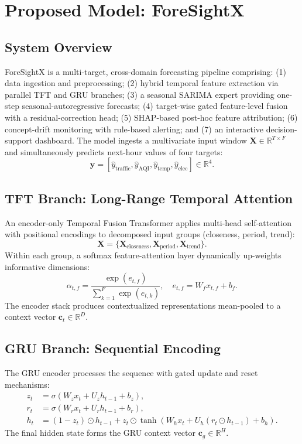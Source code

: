 \documentclass[conference]{IEEEtran}
\begin{document}
\section{Proposed Model: ForeSightX}
\subsection{System Overview}
ForeSightX is a multi-target, cross-domain forecasting pipeline comprising: (1) data ingestion and preprocessing; (2) hybrid temporal feature extraction via parallel TFT and GRU branches; (3) a seasonal SARIMA expert providing one-step seasonal-autoregressive forecasts; (4) target-wise gated feature-level fusion with a residual-correction head; (5) SHAP-based post-hoc feature attribution; (6) concept-drift monitoring with rule-based alerting; and (7) an interactive decision-support dashboard. The model ingests a multivariate input window $\mathbf{X} \in \mathbb{R}^{T \times F}$ and simultaneously predicts next-hour values of four targets:
\begin{equation}
\hat{\mathbf{y}} = [\hat{y}_{\text{traffic}}, \hat{y}_{\text{AQI}}, \hat{y}_{\text{temp}}, \hat{y}_{\text{elec}}] \in \mathbb{R}^{4}.
\end{equation}

\subsection{TFT Branch: Long-Range Temporal Attention}
An encoder-only Temporal Fusion Transformer applies multi-head self-attention with positional encodings to decomposed input groups (closeness, period, trend):
\begin{equation}
\mathbf{X} = \{\mathbf{X}_{\text{closeness}}, \mathbf{X}_{\text{period}}, \mathbf{X}_{\text{trend}}\}.
\end{equation}
Within each group, a softmax feature-attention layer dynamically up-weights informative dimensions:
\begin{equation}
\alpha_{t,f} = \frac{\exp(e_{t,f})}{\sum_{k=1}^{F}\exp(e_{t,k})}, \quad e_{t,f} = W_f x_{t,f} + b_f.
\end{equation}
The encoder stack produces contextualized representations mean-pooled to a context vector $\mathbf{c}_t \in \mathbb{R}^{D}$.

\subsection{GRU Branch: Sequential Encoding}
The GRU encoder processes the sequence with gated update and reset mechanisms:
\begin{align}
z_t &= \sigma(W_z x_t + U_z h_{t-1} + b_z),\\
r_t &= \sigma(W_r x_t + U_r h_{t-1} + b_r),\\
h_t &= (1-z_t)\odot h_{t-1} + z_t \odot \tanh(W_h x_t + U_h(r_t \odot h_{t-1}) + b_h).
\end{align}
The final hidden state forms the GRU context vector $\mathbf{c}_g \in \mathbb{R}^{H}$.
\end{document}

